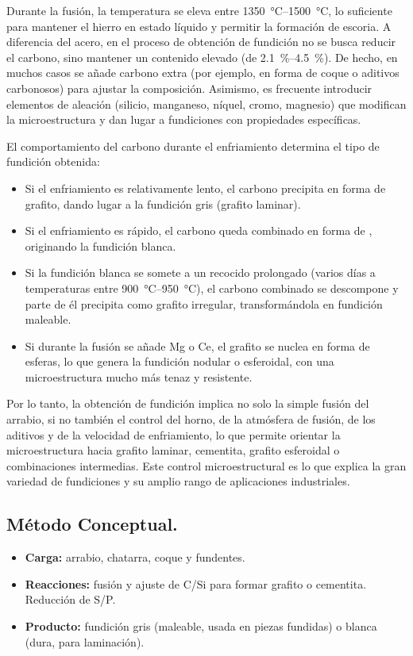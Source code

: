 \documentclass[12pt,a4paper]{article}
\begin{document}
Durante la fusión, la temperatura se eleva entre \SIrange[range-phrase = { y }]{1350}{1500}{\celsius}, lo suficiente para mantener el hierro en estado líquido y permitir la formación de escoria. A diferencia del acero, en el proceso de obtención de fundición no se busca reducir el carbono, sino mantener un contenido elevado (de \SIrange[range-units=single]{2,1}{4,5}{\percent}). De hecho, en muchos casos se añade carbono extra (por ejemplo, en forma de coque o aditivos carbonosos) para ajustar la composición. Asimismo, es frecuente introducir elementos de aleación (silicio, manganeso, níquel, cromo, magnesio) que modifican la microestructura y dan lugar a fundiciones con propiedades específicas.

El comportamiento del carbono durante el enfriamiento determina el tipo de fundición obtenida:

\begin{itemize}
    \item Si el enfriamiento es relativamente lento, el carbono precipita en forma de grafito, dando lugar a la fundición gris (grafito laminar).
    \item Si el enfriamiento es rápido, el carbono queda combinado en forma de , originando la fundición blanca.
    \item Si la fundición blanca se somete a un recocido prolongado (varios días a temperaturas entre \SIrange[range-phrase = { y }, range-units=single]{900}{950}{\celsius}), el carbono combinado se descompone y parte de él precipita como grafito irregular, transformándola en fundición maleable.
    \item Si durante la fusión se añade Mg o Ce, el grafito se nuclea en forma de esferas, lo que genera la fundición nodular o esferoidal, con una microestructura mucho más tenaz y resistente.
\end{itemize}

Por lo tanto, la obtención de fundición implica no solo la simple fusión del arrabio, si no también el control del horno, de la atmósfera de fusión, de los aditivos y de la velocidad de enfriamiento, lo que permite orientar la microestructura hacia grafito laminar, cementita, grafito esferoidal o combinaciones intermedias. Este control microestructural es lo que explica la gran variedad de fundiciones y su amplio rango de aplicaciones industriales.

\subsection{Método Conceptual.}
\begin{itemize}
    \item \textbf{Carga:} arrabio, chatarra, coque y fundentes.
    \item \textbf{Reacciones:} fusión y ajuste de C/Si para formar grafito o cementita. Reducción de S/P.
    \item \textbf{Producto:} fundición gris (maleable, usada en piezas fundidas) o blanca (dura, para laminación).
\end{itemize}
\end{document}
